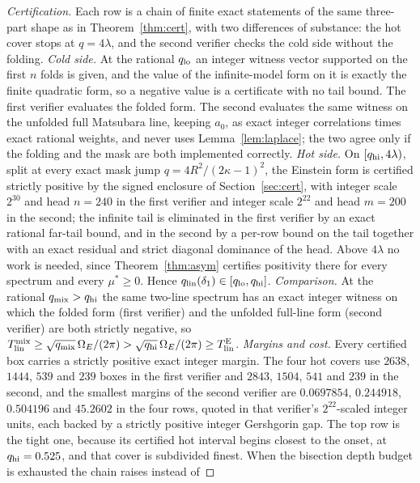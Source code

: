 \documentclass[11pt]{article}
\newcommand{\Tlin}{T_{\mathrm{lin}}}
\newcommand{\OmE}{\Omega_E}
\newcommand{\muS}{\mu^{*}}
\theoremstyle{definition}
\theoremstyle{remark}
\begin{document}
\begin{proof}[Certification]
Each row is a chain of finite exact statements of the same three-part shape as in
Theorem~\ref{thm:cert}, with two differences of substance: the hot cover stops at
$q=4\lambda$, and the second verifier checks the cold side without the folding.
\emph{Cold side.} At the rational $q_{\rm lo}$ an integer witness vector supported on the
first $n$ folds is given, and the value of the infinite-model form on it is exactly the
finite quadratic form, so a negative value is a certificate with no tail bound. The first
verifier evaluates the folded form. The second evaluates the same witness on the unfolded
full Matsubara line, keeping $a_0$, as exact integer correlations times exact rational
weights, and never uses Lemma~\ref{lem:laplace}; the two agree only if the folding and the
mask are both implemented correctly.
\emph{Hot side.} On $[q_{\rm hi},4\lambda)$, split at every exact mask jump
$q=4R^2/(2\kappa-1)^2$, the Einstein form is certified strictly positive by the signed
enclosure of Section~\ref{sec:cert}, with integer scale $2^{30}$ and head $n=240$ in the
first verifier and integer scale $2^{22}$ and head $m=200$ in the second; the infinite tail
is eliminated in the first verifier by an exact rational far-tail bound, and in the second
by a per-row bound on the tail together with an exact residual and strict diagonal
dominance of the head. Above $4\lambda$ no work is needed, since
Theorem~\ref{thm:asym} certifies positivity there for every spectrum and every
$\muS\ge0$. Hence $q_{\rm lin}(\delta_1)\in[q_{\rm lo},q_{\rm hi}]$.
\emph{Comparison.} At the rational $q_{\rm mix}>q_{\rm hi}$ the same two-line spectrum has
an exact integer witness on which the folded form (first verifier) and the unfolded
full-line form (second verifier) are both strictly negative, so
$\Tlin^{\rm mix}\ge\sqrt{q_{\rm mix}}\,\OmE/(2\pi)>\sqrt{q_{\rm hi}}\,\OmE/(2\pi)\ge
\Tlin^{\rm E}$.
\emph{Margins and cost.} Every certified box carries a strictly positive exact integer
margin. The four hot covers use $2638$, $1444$, $539$ and $239$ boxes in the first
verifier and $2843$, $1504$, $541$ and $239$ in the second, and the smallest margins of
the second verifier are $0.0697854$, $0.244918$, $0.504196$ and $45.2602$ in the four
rows, quoted in that verifier's $2^{22}$-scaled integer units, each backed by a strictly
positive integer Gershgorin gap. The top row is the tight one, because its certified hot
interval begins closest to the onset, at $q_{\rm hi}=0.525$, and that cover is subdivided
finest. When the bisection depth budget is exhausted the chain raises instead of

\end{proof}
\end{document}

